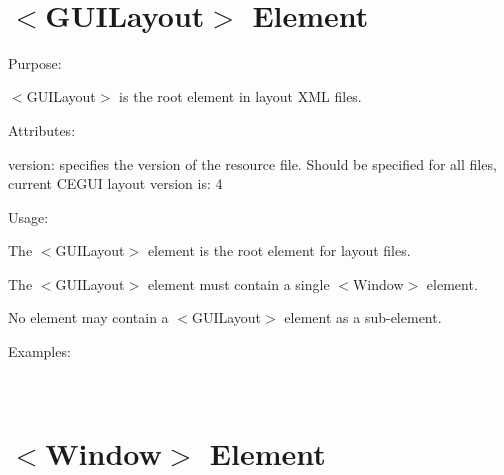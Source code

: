 ~\newline
 \hypertarget{xml_layout_xml_layout_guilayout}{}\section{$<$\+G\+U\+I\+Layout$>$ Element}\label{xml_layout_xml_layout_guilayout}

\begin{DoxyItemize}
\item Purpose\+:
\begin{DoxyItemize}
\item $<$G\+U\+I\+Layout$>$ is the root element in layout X\+ML files.
\end{DoxyItemize}
\item Attributes\+:
\begin{DoxyItemize}
\item {\ttfamily version\+:} specifies the version of the resource file. Should be specified for all files, current C\+E\+G\+UI layout version is\+: 4
\end{DoxyItemize}
\item Usage\+:
\begin{DoxyItemize}
\item The $<$G\+U\+I\+Layout$>$ element is the root element for layout files.
\item The $<$G\+U\+I\+Layout$>$ element must contain a single $<$Window$>$ element.
\item No element may contain a $<$G\+U\+I\+Layout$>$ element as a sub-\/element.
\end{DoxyItemize}
\item Examples\+:
\end{DoxyItemize}

~\newline
 \hypertarget{xml_layout_xml_layout_window}{}\section{$<$\+Window$>$ Element}\label{xml_layout_xml_layout_window}

